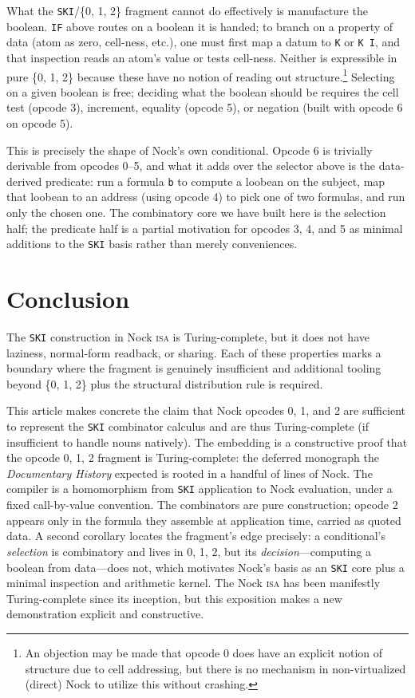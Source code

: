 \documentclass[twoside]{article}
\begin{document}
What the \texttt{SKI}/\{0, 1, 2\} fragment cannot do effectively is manufacture the boolean.  \lstinline[style=inlinecode]{IF} above routes on a boolean it is handed; to branch on a property of data (atom as zero, cell-ness, etc.), one must first map a datum to \lstinline[style=inlinecode]{K} or \lstinline[style=inlinecode]{K I}, and that inspection reads an atom's value or tests cell-ness.  Neither is expressible in pure \{0, 1, 2\} because these have no notion of reading out structure.\footnote{An objection may be made that opcode 0 does have an explicit notion of structure due to cell addressing, but there is no mechanism in non-virtualized (direct) Nock to utilize this without crashing.}  Selecting on a given boolean is free; deciding what the boolean should be requires the cell test (opcode 3), increment, equality (opcode 5), or negation (built with opcode 6 on opcode 5).

This is precisely the shape of Nock's own conditional.  Opcode 6 is trivially derivable from opcodes 0–5, and what it adds over the selector above is the data-derived predicate:  run a formula \texttt{b} to compute a loobean on the subject, map that loobean to an address (using opcode 4) to pick one of two formulas, and run only the chosen one.  The combinatory core we have built here is the selection half; the predicate half is a partial motivation for opcodes 3, 4, and 5 as minimal additions to the \texttt{SKI} basis rather than merely conveniences.

\section{Conclusion}

The \texttt{SKI} construction in Nock \textsc{isa} is Turing-complete, but it does not have laziness, normal-form readback, or sharing.  Each of these properties marks a boundary where the fragment is genuinely insufficient and additional tooling beyond \{0, 1, 2\} plus the structural distribution rule is required.

This article makes concrete the claim that Nock opcodes 0, 1, and 2 are sufficient to represent the \texttt{SKI} combinator calculus and are thus Turing-complete (if insufficient to handle nouns natively).  The embedding is a constructive proof that the opcode {0, 1, 2} fragment is Turing-complete:  the deferred monograph the \emph{Documentary History} expected is rooted in a handful of lines of Nock.  The compiler is a homomorphism from \texttt{SKI} application to Nock evaluation, under a fixed call-by-value convention.  The combinators are pure construction; opcode 2 appears only in the formula they assemble at application time, carried as quoted data.  A second corollary locates the fragment's edge precisely: a conditional's \emph{selection} is combinatory and lives in {0, 1, 2}, but its \emph{decision}---computing a boolean from data---does not, which motivates Nock's basis as an \texttt{SKI} core plus a minimal inspection and arithmetic kernel.  The Nock \textsc{isa} has been manifestly Turing-complete since its inception, but this exposition makes a new demonstration explicit and constructive.\tombstone

\printbibliography
\end{document}
